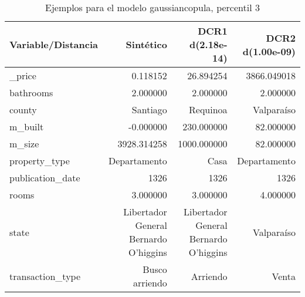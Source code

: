 \begin{table}[H]
\centering
\fontsize{10}{14}\selectfont
\caption{Ejemplos para el modelo gaussiancopula, percentil 3}
\label{table-example-economicos-b-3-gaussiancopula-3p}
\begin{tabular}{|l|r|r|r|}
\hline
\rowcolor[gray]{0.8}
Variable/Distancia & Sintético & DCR1 d(2.18e-14) & DCR2 d(1.00e-09) \\
\hline \_price & \cellcolor[rgb]{0.9, 0.54, 0.52} 0.118152 & 26.894254 & 3866.049018 \\
\hline bathrooms & \cellcolor[rgb]{0.9, 0.54, 0.52} 2.000000 & \cellcolor[rgb]{0.9, 0.54, 0.52} 2.000000 & \cellcolor[rgb]{0.9, 0.54, 0.52} 2.000000 \\
\hline county & \cellcolor[rgb]{0.9, 0.54, 0.52} Santiago & Requinoa & Valparaíso \\
\hline m\_built & \cellcolor[rgb]{0.9, 0.54, 0.52} -0.000000 & 230.000000 & 82.000000 \\
\hline m\_size & \cellcolor[rgb]{0.9, 0.54, 0.52} 3928.314258 & 1000.000000 & 82.000000 \\
\hline property\_type & \cellcolor[rgb]{0.9, 0.54, 0.52} Departamento & Casa & \cellcolor[rgb]{0.9, 0.54, 0.52} Departamento \\
\hline publication\_date & \cellcolor[rgb]{0.9, 0.54, 0.52} 1326 & \cellcolor[rgb]{0.9, 0.54, 0.52} 1326 & \cellcolor[rgb]{0.9, 0.54, 0.52} 1326 \\
\hline rooms & \cellcolor[rgb]{0.9, 0.54, 0.52} 3.000000 & \cellcolor[rgb]{0.9, 0.54, 0.52} 3.000000 & 4.000000 \\
\hline state & \cellcolor[rgb]{0.9, 0.54, 0.52} Libertador General Bernardo O'higgins & \cellcolor[rgb]{0.9, 0.54, 0.52} Libertador General Bernardo O'higgins & Valparaíso \\
\hline transaction\_type & \cellcolor[rgb]{0.9, 0.54, 0.52} Busco arriendo & Arriendo & Venta \\
\hline
\end{tabular}
\end{table}
